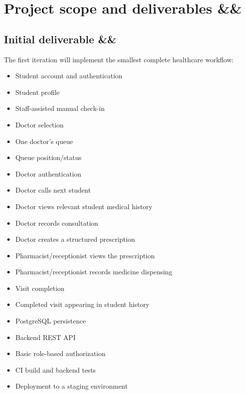 \documentclass[11pt,a4paper]{article}
\newcommand{\BvrHint}[1]{%
  \ifx&#1&%
  \else
    {\normalfont\normalsize\itshape\hfill #1}%
  \fi}
\begin{document}

\section{Project scope and deliverables %
\BvrHint{}}

\subsection{Initial deliverable %
\BvrHint{}}

The first iteration will implement the smallest complete healthcare workflow:

\begin{itemize}

    \item Student account and authentication
    \item Student profile
    \item Staff-assisted manual check-in
    \item Doctor selection
    \item One doctor's queue
    \item Queue position/status
    \item Doctor authentication
    \item Doctor calls next student
    \item Doctor views relevant student medical history
    \item Doctor records consultation
    \item Doctor creates a structured prescription
    \item Pharmacist/receptionist views the prescription
    \item Pharmacist/receptionist records medicine dispensing
    \item Visit completion
    \item Completed visit appearing in student history
    \item PostgreSQL persistence
    \item Backend REST API
    \item Basic role-based authorization
    \item CI build and backend tests
    \item Deployment to a staging environment

\end{itemize}
\end{document}
